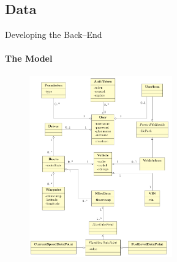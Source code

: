     \subsection{Data}
        \begin{frame}[t]{Developing the Back--End}\framesubtitle{The Model}
            \begin{figure}[htb]
                    \centering
                    \includegraphics[width=0.55\textwidth]{class_diagram.png}
                \end{figure}
        \end{frame}

